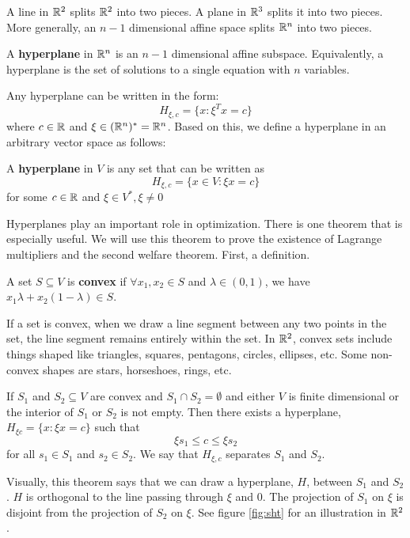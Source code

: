 A line in $\mathbb{R}^2$ splits $\mathbb{R}^2$ into two pieces. A plane in $\mathbb{R}^3$
splits it into two pieces. More generally, an $n-1$ dimensional
affine space splits $\mathbb{R}^n$ into two pieces.
\begin{definition}
  A \textbf{hyperplane} in $\mathbb{R}^n$ is an $n-1$ dimensional affine
  subspace. Equivalently, a hyperplane is the set of solutions to a
  single equation with $n$ variables.
\end{definition}
Any hyperplane can be written in the form:
\[ H_{\xi,c} = \{x: \xi^Tx = c \} \]
where $c \in \mathbb{R}$ and $\xi \in (\mathbb{R}^n)^*=\mathbb{R}^n$. Based on this, we define
a hyperplane in an arbitrary vector space as follows:
\begin{definition}
  A \textbf{hyperplane} in $V$ is any set that can be written as
  \[ H_{\xi,c} = \{x \in V: \xi x = c\} \]
  for some $c \in \mathbb{R}$ and $\xi \in V^*, \xi \neq 0$
\end{definition}
Hyperplanes play an important role in optimization.  There is one
theorem that is especially useful.  We will use this theorem to prove
the existence of Lagrange multipliers and the second welfare
theorem. First, a definition.
\begin{definition}
  A set $S \subseteq V$ is \textbf{convex} if $\forall x_1, x_2 \in
  S$ and $\lambda \in (0,1)$, we have $x_1 \lambda + x_2(1-\lambda)
  \in S$.
\end{definition}
If a set is convex, when we draw a line segment between any two points
in the set, the line segment remains entirely within the set.  In
$\mathbb{R}^2$, convex sets include things shaped like triangles, squares,
pentagons, circles, ellipses, etc. Some non-convex shapes are stars,
horseshoes, rings, etc.
\begin{theorem} \label{thm:sht} If
  $S_1$ and $S_2 \subseteq V$ are convex and
  $S_1 \cap S_2 = \emptyset$ and either $V$ is finite dimensional or
  the interior of $S_1$ or $S_2$ is not empty. Then there exists a
  hyperplane, $H_{\xi c} = \{ x: \xi x = c \}$ such that
  \[ \xi s_1 \leq c \leq \xi s_2 \]
  for all $s_1 \in S_1$ and $s_2 \in S_2$. We say that $H_{\xi,c}$
  separates $S_1$ and $S_2$. 
\end{theorem}
Visually, this theorem says that we can draw a hyperplane, $H$,
between $S_1$ and $S_2$. $H$ is orthogonal to the line passing through
$\xi$ and $0$. The projection of $S_1$ on $\xi$ is disjoint from
the projection of $S_2$ on $\xi$. See figure \ref{fig:sht} for an
illustration in $\mathbb{R}^2$.


